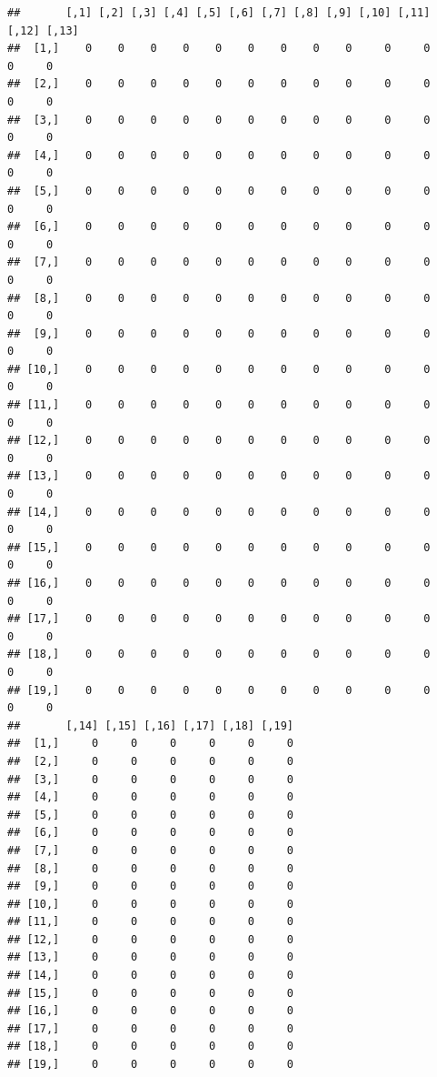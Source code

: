\documentclass[]{article}
\begin{document}
\begin{verbatim}
##       [,1] [,2] [,3] [,4] [,5] [,6] [,7] [,8] [,9] [,10] [,11] [,12] [,13]
##  [1,]    0    0    0    0    0    0    0    0    0     0     0     0     0
##  [2,]    0    0    0    0    0    0    0    0    0     0     0     0     0
##  [3,]    0    0    0    0    0    0    0    0    0     0     0     0     0
##  [4,]    0    0    0    0    0    0    0    0    0     0     0     0     0
##  [5,]    0    0    0    0    0    0    0    0    0     0     0     0     0
##  [6,]    0    0    0    0    0    0    0    0    0     0     0     0     0
##  [7,]    0    0    0    0    0    0    0    0    0     0     0     0     0
##  [8,]    0    0    0    0    0    0    0    0    0     0     0     0     0
##  [9,]    0    0    0    0    0    0    0    0    0     0     0     0     0
## [10,]    0    0    0    0    0    0    0    0    0     0     0     0     0
## [11,]    0    0    0    0    0    0    0    0    0     0     0     0     0
## [12,]    0    0    0    0    0    0    0    0    0     0     0     0     0
## [13,]    0    0    0    0    0    0    0    0    0     0     0     0     0
## [14,]    0    0    0    0    0    0    0    0    0     0     0     0     0
## [15,]    0    0    0    0    0    0    0    0    0     0     0     0     0
## [16,]    0    0    0    0    0    0    0    0    0     0     0     0     0
## [17,]    0    0    0    0    0    0    0    0    0     0     0     0     0
## [18,]    0    0    0    0    0    0    0    0    0     0     0     0     0
## [19,]    0    0    0    0    0    0    0    0    0     0     0     0     0
##       [,14] [,15] [,16] [,17] [,18] [,19]
##  [1,]     0     0     0     0     0     0
##  [2,]     0     0     0     0     0     0
##  [3,]     0     0     0     0     0     0
##  [4,]     0     0     0     0     0     0
##  [5,]     0     0     0     0     0     0
##  [6,]     0     0     0     0     0     0
##  [7,]     0     0     0     0     0     0
##  [8,]     0     0     0     0     0     0
##  [9,]     0     0     0     0     0     0
## [10,]     0     0     0     0     0     0
## [11,]     0     0     0     0     0     0
## [12,]     0     0     0     0     0     0
## [13,]     0     0     0     0     0     0
## [14,]     0     0     0     0     0     0
## [15,]     0     0     0     0     0     0
## [16,]     0     0     0     0     0     0
## [17,]     0     0     0     0     0     0
## [18,]     0     0     0     0     0     0
## [19,]     0     0     0     0     0     0
\end{verbatim}
\end{document}

